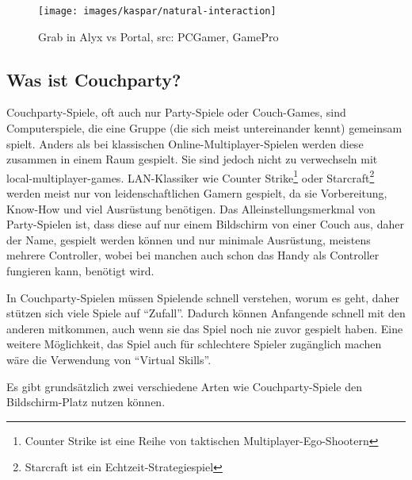 \begin{figure}[H]
	\centering
	\texttt{[image: images/kaspar/natural-interaction]}
	\caption{Grab in Alyx vs Portal, src: PCGamer, GamePro}
\end{figure}

\subsection{Was ist Couchparty?\label{_party_games}}

Couchparty-Spiele, oft auch nur Party-Spiele oder Couch-Games, sind Computerspiele, die eine Gruppe (die sich meist untereinander kennt) gemeinsam spielt. Anders als bei klassischen Online-Multiplayer-Spielen werden diese zusammen in einem Raum gespielt. Sie sind jedoch nicht zu verwechseln mit local-multiplayer-games. LAN-Klassiker wie Counter Strike\footnote{Counter Strike ist eine Reihe von taktischen Multiplayer-Ego-Shootern} oder Starcraft\footnote{Starcraft ist ein Echtzeit-Strategiespiel} werden meist nur von leidenschaftlichen Gamern gespielt, da sie Vorbereitung, Know-How und viel Ausrüstung benötigen. Das Alleinstellungsmerkmal von Party-Spielen ist, dass diese auf nur einem Bildschirm von einer Couch aus, daher der Name, gespielt werden können und nur minimale Ausrüstung, meistens mehrere Controller, wobei bei manchen auch schon das Handy als Controller fungieren kann, benötigt wird.

In Couchparty-Spielen müssen Spielende schnell verstehen, worum es geht, daher stützen sich viele Spiele auf "`Zufall"'. Dadurch können Anfangende schnell mit den anderen mitkommen, auch wenn sie das Spiel noch nie zuvor gespielt haben. Eine weitere Möglichkeit, das Spiel auch für schlechtere Spieler zugänglich machen wäre die Verwendung von "`Virtual Skills"'\cite[S. 165]{_art_of_gamedesign}.

Es gibt grundsätzlich zwei verschiedene Arten wie Couchparty-Spiele den Bildschirm-Platz nutzen können.

